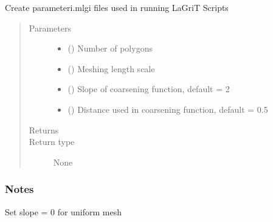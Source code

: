 \documentclass[letterpaper,10pt,english]{sphinxmanual}
\begin{document}
\begin{fulllineitems}
\label{\detokenize{pydfnworks:pydfnworks.dfnGen.lagrit_scripts.create_parameter_mlgi_file}}
Create parameteri.mlgi files used in running LaGriT Scripts
\begin{quote}\begin{description}
\item[{Parameters}] \leavevmode\begin{itemize}
\item {} 
 () \textendash{} Number of polygons

\item {} 
 () \textendash{} Meshing length scale

\item {} 
 () \textendash{} Slope of coarsening function, default = 2

\item {} 
 () \textendash{} Distance used in coarsening function, default = 0.5

\end{itemize}

\item[{Returns}] \leavevmode


\item[{Return type}] \leavevmode
None

\end{description}\end{quote}
\subsubsection*{Notes}

Set slope = 0 for uniform mesh

\end{fulllineitems}

\end{document}
